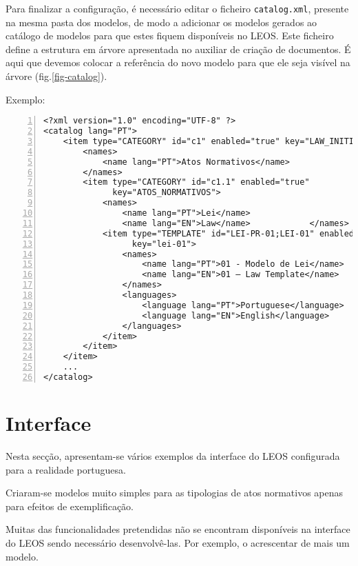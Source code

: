 Para finalizar a configuração, é necessário editar o ficheiro \texttt{catalog.xml}, 
presente na mesma pasta dos modelos, de modo a adicionar os modelos gerados ao catálogo de modelos 
para que estes fiquem disponíveis no LEOS. 
Este ficheiro define a estrutura em árvore apresentada no auxiliar de criação de documentos. 
É aqui que devemos colocar a referência do novo modelo para que ele seja visível na árvore (fig.\ref{fig-catalog}).

  
Exemplo:
 
\begin{Verbatim}[frame=single, numbers=left, fontsize=\scriptsize, commandchars=\\\{\}]
<?xml version="1.0" encoding="UTF-8" ?>
<catalog lang="PT">
    <item type="CATEGORY" id="c1" enabled="true" key="LAW_INITIATIVE">
        <names>
            <name lang="PT">Atos Normativos</name>
        </names>
        <item type="CATEGORY" id="c1.1" enabled="true" 
              key="ATOS_NORMATIVOS">
            <names>
                <name lang="PT">Lei</name>
                <name lang="EN">Law</name>            </names>
            <item type="TEMPLATE" id="LEI-PR-01;LEI-01" enabled="true" 
                  key="lei-01">
                <names>
                    <name lang="PT">01 - Modelo de Lei</name>
                    <name lang="EN">01 – Law Template</name>
                </names>
                <languages>
                    <language lang="PT">Portuguese</language>
                    <language lang="EN">English</language>
                </languages>
            </item>
        </item>
    </item>
    ... 
</catalog>
\end{Verbatim} 


\section{Interface}

Nesta secção, apresentam-se vários exemplos da interface do LEOS configurada para a realidade portuguesa.

Criaram-se modelos muito simples para as tipologias de atos normativos apenas para efeitos de exemplificação.
 


Muitas das funcionalidades pretendidas não se encontram disponíveis na interface do LEOS sendo necessário desenvolvê-las.
Por exemplo, o acrescentar de mais um modelo.